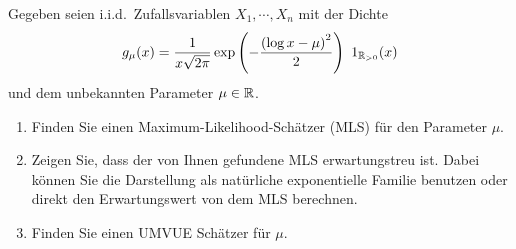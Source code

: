 Gegeben seien i.i.d.\ Zufallsvariablen $X_1, \cdots, X_n$  mit der Dichte
\begin{equation*}
    g_{\mu}(x) = \frac{1}{x \sqrt{2\pi}} \exp \left( - \frac{ \left( \log x - \mu \right)^2 }{2} \right) \ 1_{\mathbb R_{>0}}(x)
\end{equation*}
und dem unbekannten Parameter $\mu \in \mathbb R$. 
\begin{enumerate}
    \item Finden Sie einen Maximum-Likelihood-Schätzer (MLS) für den Parameter $\mu$. 
    \item Zeigen Sie, dass der von Ihnen gefundene MLS erwartungstreu ist.
        Dabei können Sie die Darstellung als natürliche exponentielle
        Familie benutzen oder direkt den Erwartungswert von dem MLS berechnen. 
    \item Finden Sie einen UMVUE Schätzer für $\mu$. 
\end{enumerate}

